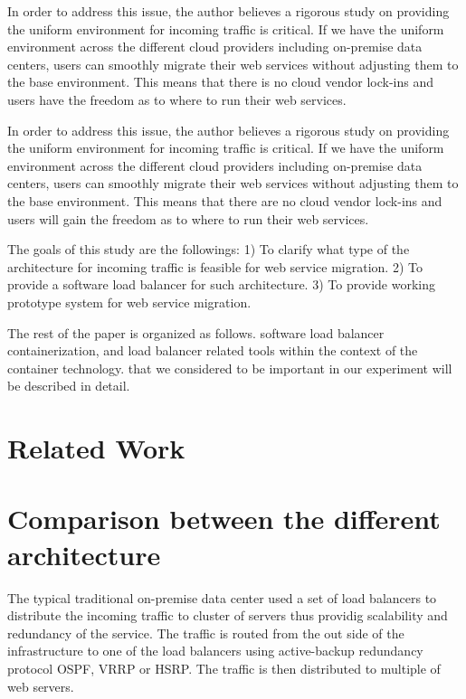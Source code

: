 In order to address this issue, the author believes a rigorous study on providing the uniform environment for incoming traffic is critical.
If we have the uniform environment across the different cloud providers including on-premise data centers, users can smoothly migrate their web services without adjusting them to the base environment.
This means that there is no cloud vendor lock-ins and users have the freedom as to where to run their web services.

In order to address this issue, the author believes a rigorous study on providing the uniform environment for incoming traffic is critical.
If we have the uniform environment across the different cloud providers including on-premise data centers, users can smoothly migrate their web services without adjusting them to the base environment.
This means that there are no cloud vendor lock-ins and users will gain the freedom as to where to run their web services.

The goals of this study are the followings:
1) To clarify what type of the architecture for incoming traffic is feasible for web service migration.
2) To provide a software load balancer for such architecture.
3) To provide working prototype system for web service migration.

The rest of the paper is organized as follows.
software load balancer containerization, and load balancer related tools within the context of the container technology. 
that we considered to be important in our experiment will be described in detail.

\section{Related Work}\label{Related Work}

\section{Comparison between the different architecture}\label{Routing}
The typical traditional on-premise data center used a set of load balancers to distribute the incoming traffic to cluster of servers thus providig scalability and redundancy of the service.
The traffic is routed from the out side of the infrastructure to one of the load balancers using active-backup redundancy protocol OSPF, VRRP or HSRP.
The traffic is then distributed to multiple of web servers.



